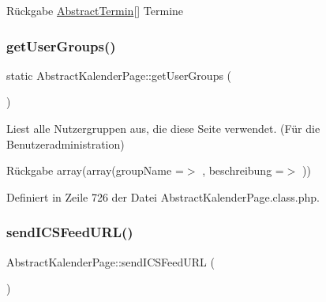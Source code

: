 \begin{DoxyReturn}{Rückgabe}
\mbox{\hyperlink{class_abstract_termin}{Abstract\+Termin}}\mbox{[}\mbox{]} Termine 
\end{DoxyReturn}
\mbox{\label{class_abstract_kalender_page_aa13b71bde8552e68ad01019cb3c8ae73}} 
\subsubsection{\texorpdfstring{get\+User\+Groups()}{getUserGroups()}}
{\footnotesize\ttfamily static Abstract\+Kalender\+Page\+::get\+User\+Groups (\begin{DoxyParamCaption}{ }\end{DoxyParamCaption})\hspace{0.3cm}{\ttfamily [static]}}

Liest alle Nutzergruppen aus, die diese Seite verwendet. (Für die Benutzeradministration) \begin{DoxyReturn}{Rückgabe}
array(array(\textquotesingle{}group\+Name\textquotesingle{} =$>$ \textquotesingle{}\textquotesingle{}, \textquotesingle{}beschreibung\textquotesingle{} =$>$ \textquotesingle{}\textquotesingle{})) 
\end{DoxyReturn}


Definiert in Zeile 726 der Datei Abstract\+Kalender\+Page.\+class.\+php.

\mbox{\label{class_abstract_kalender_page_ae95ebf53fc82e90beccfb6d81045331f}} 
\subsubsection{\texorpdfstring{send\+I\+C\+S\+Feed\+U\+R\+L()}{sendICSFeedURL()}}
{\footnotesize\ttfamily Abstract\+Kalender\+Page\+::send\+I\+C\+S\+Feed\+U\+RL (\begin{DoxyParamCaption}{ }\end{DoxyParamCaption})\hspace{0.3cm}{\ttfamily [abstract]}}

